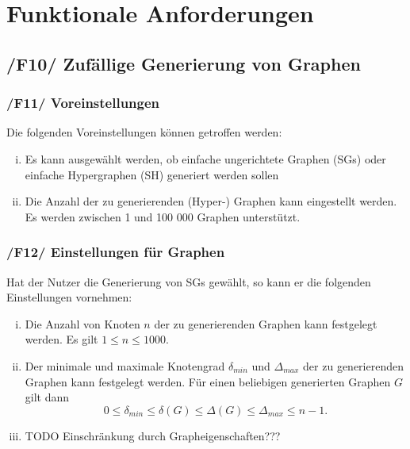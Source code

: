 \documentclass{article}
\begin{document}
	
	
	\newpage
	\section{Funktionale Anforderungen}
	
	\subsection*{/F10/ Zufällige Generierung von Graphen}
	\subsubsection*{/F11/ Voreinstellungen}
	Die folgenden Voreinstellungen können getroffen werden:
	\begin{enumerate}[i)]
		\item{Es kann ausgewählt werden, ob einfache ungerichtete Graphen (SGs) oder einfache Hypergraphen (SH) generiert werden sollen}
		\item{Die Anzahl der zu generierenden (Hyper-) Graphen kann eingestellt werden. Es werden zwischen 1 und 100 000 Graphen unterstützt.}
	\end{enumerate}
	
	\subsubsection*{/F12/ Einstellungen für Graphen}
	Hat der Nutzer die Generierung von SGs gewählt, so kann er die folgenden Einstellungen vornehmen:
	\begin{enumerate}[i)]
		\item{Die Anzahl von Knoten $n$ der zu generierenden Graphen kann festgelegt werden. Es gilt $1 \leq n \leq 1000$.}
		\item{Der minimale und maximale Knotengrad $\delta_{min}$ und $\Delta_{max}$ der zu generierenden Graphen kann festgelegt werden. Für einen beliebigen generierten Graphen $G$ gilt dann $$0 \leq \delta_{min} \leq \delta(G) \leq \Delta(G) \leq \Delta_{max} \leq n-1.$$}
		\item{TODO Einschränkung durch Grapheigenschaften???}
	\end{enumerate}
	
\end{document}
